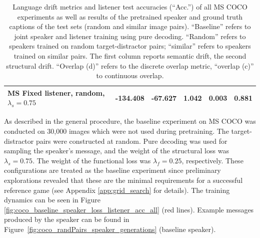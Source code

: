 \begin{table}[]
\begin{tabularx}{\textwidth}{|X|l|l|X|X|X|}
		MS Fixed listener, random, $\lambda_s = 0.75$  &         -134.408          &           -67.627             &     1.042                 &        0.003              &                          0.881     \\ \hline
	\end{tabularx}
\caption{\label{tab:coco_drift_metrics_basic}Language drift metrics and listener test accuracies (``Acc.'') of all MS COCO experiments as well as results of the pretrained speaker and ground truth captions of the test sets (random and similar image pairs). ``Baseline'' refers to joint speaker and listener training using pure decoding. ``Random'' refers to speakers trained on random target-distractor pairs; ``similar'' refers to speakers trained on similar pairs. The first column reports semantic drift, the second structural drift. ``Overlap (d)'' refers to the discrete overlap metric, ``overlap (c)'' to continuous overlap.}
\end{table}

As described in the general procedure, the baseline experiment on MS COCO was conducted on 30,000 images which were not used during pretraining. The target-distractor pairs were constructed at random. Pure decoding was used for sampling the speaker's message, and the weight of the structural loss was $\lambda_s = 0.75$. The weight of the functional loss was $\lambda_f = 0.25$, respectively. These configurations are treated as the baseline experiment since preliminary explorations revealed that these are the minimal requirements for a successful reference game (see Appendix \ref{app:grid_search} for details). The training dynamics can be seen in Figure \ref{fig:coco_baseline_speaker_loss_listener_acc_all} (red lines). Example messages produced by the speaker can be found in Figure~\ref{fig:coco_randPairs_speaker_generations} (baseline speaker).

